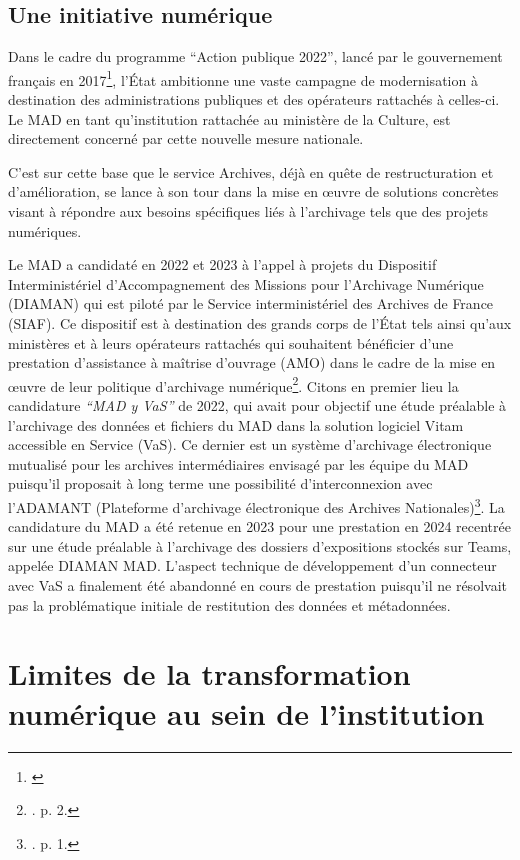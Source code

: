 \subsection*{Une initiative numérique}

Dans le cadre du programme \enquote{Action publique 2022}, lancé par le gouvernement français en 2017\footnote{\cite{ditp-action-publique-2018}}, l’État ambitionne une vaste campagne de modernisation à destination des administrations publiques et des opérateurs rattachés à celles-ci. Le MAD  en tant qu’institution rattachée au ministère de la Culture, est directement concerné par cette nouvelle mesure nationale.

C’est sur cette base que le service Archives, déjà en quête de restructuration et d’amélioration, se lance à son tour dans la mise en œuvre de solutions concrètes visant à répondre aux besoins spécifiques liés à l’archivage tels que des projets numériques.

Le MAD a candidaté en 2022 et 2023 à l’appel à projets du Dispositif Interministériel d’Accompagnement des Missions pour l’Archivage Numérique (DIAMAN) qui est piloté par le Service interministériel des Archives de France (SIAF). Ce dispositif est à destination des grands corps de l’État tels ainsi qu’aux ministères et à leurs opérateurs rattachés qui souhaitent bénéficier d’une prestation d’assistance à maîtrise d’ouvrage (AMO) dans le cadre de la mise en œuvre de leur politique d’archivage numérique\footnote{\cite{bomel-dion-mad-y-vas-2022}. p. 2.}. Citons en premier lieu la candidature \textit{\enquote{MAD y VaS}} de 2022, qui avait pour objectif une étude préalable à l’archivage des données et fichiers du MAD dans la solution logiciel Vitam accessible en Service (VaS). Ce dernier est un système d’archivage électronique mutualisé pour les archives intermédiaires envisagé par les équipe du MAD puisqu'il proposait à long terme une possibilité d'interconnexion avec l'ADAMANT (Plateforme d’archivage électronique des Archives Nationales)\footnote{\cite{bomel-dion-mad-y-vas-2022}. p. 1.}. La candidature du MAD a été retenue en 2023 pour une prestation en 2024 recentrée sur une étude préalable à l’archivage des dossiers d’expositions stockés sur Teams, appelée DIAMAN MAD. L’aspect technique de développement d’un connecteur avec VaS a finalement été abandonné en cours de prestation puisqu’il ne résolvait pas la problématique initiale de restitution des données et métadonnées. 


\section{ Limites de la transformation numérique au sein de  l’institution}

